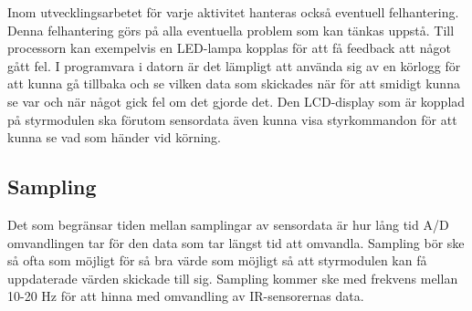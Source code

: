 \documentclass[11pt]{article}
\begin{document}
\begin{flushleft}
Inom utvecklingsarbetet för varje aktivitet hanteras också eventuell felhantering. Denna felhantering görs på alla eventuella problem som kan tänkas uppstå. Till processorn kan exempelvis en LED-lampa kopplas för att få feedback att något gått fel. I programvara i datorn är det lämpligt att använda sig av en körlogg för att kunna gå tillbaka och se vilken data som skickades när för att smidigt kunna se var och när något gick fel om det gjorde det. Den LCD-display som är kopplad på styrmodulen ska förutom sensordata även kunna visa styrkommandon för att kunna se vad som händer vid körning.

\subsection{Sampling}
Det som begränsar tiden mellan samplingar av sensordata är hur lång tid A/D omvandlingen tar för den data som tar längst tid att omvandla. Sampling bör ske så ofta som möjligt för så bra värde som möjligt så att styrmodulen kan få uppdaterade värden skickade till sig. Sampling kommer ske med frekvens mellan 10-20 Hz för att hinna med omvandling av IR-sensorernas data. 
 

\pagebreak
{}



\end{flushleft}
\end{document}
